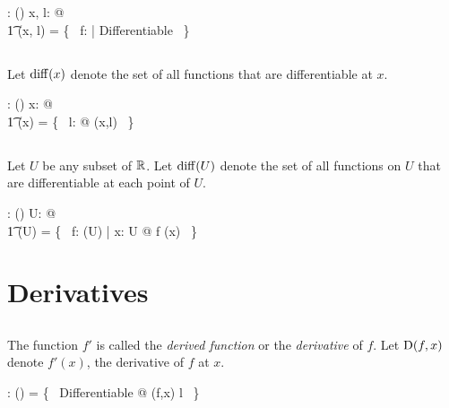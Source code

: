 \documentclass[11pt, oneside]{article}
\begin{document}
\begin{axdef}
	\diffRR: \R \cross \R \fun \power(\R \pfun \R)
\where
	\forall x, l: \R @ \\
	\t1	\diffRR(x, l) = \{~ f: \R \pfun \R | Differentiable ~\}
\end{axdef}

\subsection{}

Let $\operatorname{diff}(x)$ denote the set of all functions that are differentiable at $x$.

\begin{axdef}
	\diffR: \R \fun \power(\R \pfun \R)
\where
	\forall x: \R @ \\
	\t1	\diffR(x) = \bigcup \{~ l: \R @ \diffRR(x,l) ~\}
\end{axdef}

\subsection{}

Let $U$ be any subset of $\mathbb{R}$. 
Let $\operatorname{diff}(U)$ denote the set of all functions on $U$
that are differentiable at each point of $U$.

\begin{axdef}
	\diffPR: \power \R \fun \power(\R \pfun \R)
\where
	\forall U: \power \R @ \\
	\t1	\diffPR(U) = \{~ f: \CzeroPR(U) | \forall x: U @ f \in \diffR(x) ~\}
\end{axdef}

\section{Derivatives}

\subsection{}

The function $f'$ is called the {\it derived function} or the {\it derivative} of $f$.
Let $\operatorname{D}(f,x)$ denote $f'(x)$, the derivative of $f$ at $x$.

\begin{axdef}
	\derivFR: (\R \pfun \R) \cross \R \pfun \R
\where
	\derivFR = \{~ Differentiable @ (f,x) \mapsto l ~\}
\end{axdef}
\end{document}
